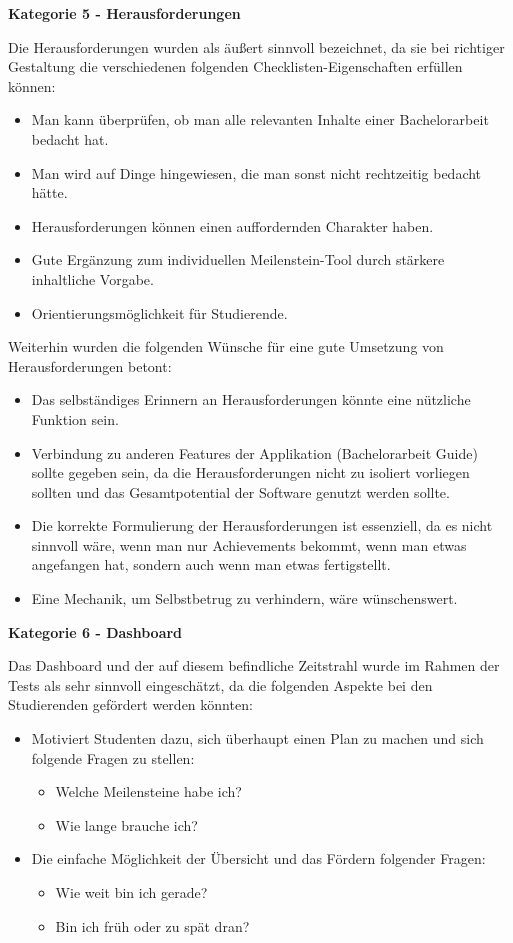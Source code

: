 \documentclass[bibliography=totoc,listof=totoc,BCOR=5mm,DIV=12,oneside]{scrbook}
\begin{document}
{\par \bigskip \textbf{Kategorie 5 - Herausforderungen}
\par Die Herausforderungen wurden als äußert sinnvoll bezeichnet, da sie bei richtiger Gestaltung die verschiedenen folgenden Checklisten-Eigenschaften erfüllen können:
\begin{itemize}
\item Man kann überprüfen, ob man alle relevanten Inhalte einer Bachelorarbeit bedacht hat.
\item Man wird auf Dinge hingewiesen, die man sonst nicht rechtzeitig bedacht hätte.
\item Herausforderungen können einen auffordernden Charakter haben.
\item Gute Ergänzung zum individuellen Meilenstein-Tool durch stärkere inhaltliche Vorgabe.
\item Orientierungsmöglichkeit für Studierende.
\end{itemize}

\newpage
\par \bigskip Weiterhin wurden die folgenden Wünsche für eine gute Umsetzung von Herausforderungen betont:
\begin{itemize}
\item Das selbständiges Erinnern an Herausforderungen könnte eine nützliche Funktion sein.
\item Verbindung zu anderen Features der Applikation (Bachelorarbeit Guide) sollte gegeben sein, da die Herausforderungen nicht zu isoliert vorliegen sollten und das Gesamtpotential der Software genutzt werden sollte.
\item Die korrekte Formulierung der Herausforderungen ist essenziell, da es nicht sinnvoll wäre, wenn man nur Achievements bekommt, wenn man etwas angefangen hat, sondern auch wenn man etwas fertigstellt.
\item Eine Mechanik, um Selbstbetrug zu verhindern, wäre wünschenswert.
\end{itemize}

\par \bigskip \textbf{Kategorie 6 - Dashboard}
\par Das Dashboard und der auf diesem befindliche Zeitstrahl wurde im Rahmen der Tests als sehr sinnvoll eingeschätzt, da  die folgenden Aspekte bei den Studierenden gefördert werden könnten:

\begin{itemize}
\item Motiviert Studenten dazu, sich überhaupt einen Plan zu machen und sich folgende Fragen zu stellen:
\begin{itemize}
\item Welche Meilensteine habe ich?
\item Wie lange brauche ich?
\end{itemize}
\item Die einfache Möglichkeit der Übersicht und das Fördern folgender Fragen:
\begin{itemize}
\item Wie weit bin ich gerade?
\item Bin ich früh oder zu spät dran?
\end{itemize}
\end{itemize}

}
\end{document}
